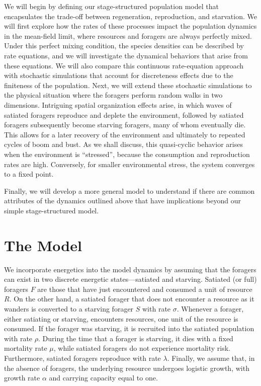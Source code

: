 \documentclass[11pt]{article}
\begin{document}
We will begin by defining our stage-structured population model that
encapsulates the trade-off between regeneration, reproduction, and
starvation.  We will first explore how the rates of these processes impact
the population dynamics in the mean-field limit, where resources and foragers
are always perfectly mixed.  Under this perfect mixing condition, the species
densities can be described by rate equations, and we will investigate the
dynamical behaviors that arise from these equations.  We will also compare
this continuous rate-equation approach with stochastic simulations that
account for discreteness effects due to the finiteness of the population.
Next, we will extend these stochastic simulations to the physical situation
where the foragers perform random walks in two dimensions.  Intriguing
spatial organization effects arise, in which waves of satiated foragers
reproduce and deplete the environment, followed by satiated foragers
subsequently become starving foragers, many of whom eventually die.  This
allows for a later recovery of the environment and ultimately to repeated
cycles of boom and bust.  As we shall discuss, this quasi-cyclic behavior
arises when the environment is ``stressed'', because the consumption and
reproduction rates are high.  Conversely, for smaller environmental stress,
the system converges to a fixed point.

Finally, we will develop a more general model to understand if there are
common attributes of the dynamics outlined above that have implications
beyond our simple stage-structured model.

\section{The Model}

We incorporate energetics into the model dynamics by assuming that the
foragers can exist in two discrete energetic states---satiated and starving.
Satiated (or full) foragers $F$ are those that have just encountered and
consumed a unit of resource $R$.  On the other hand, a satiated forager that
does not encounter a resource as it wanders is converted to a starving
forager $S$ with rate $\sigma$.  Whenever a forager, either satiating or
starving, encounters resources, one unit of the resource is consumed.  If the
forager was starving, it is recruited into the satiated population with rate
$\rho$.  During the time that a forager is starving, it dies with a fixed
mortality rate $\mu$, while satiated foragers do not experience mortality
risk.  Furthermore, satiated foragers reproduce with rate $\lambda$.
Finally, we assume that, in the absence of foragers, the underlying resource
undergoes logistic growth, with growth rate $\alpha$ and carrying capacity
equal to one.
\end{document}
